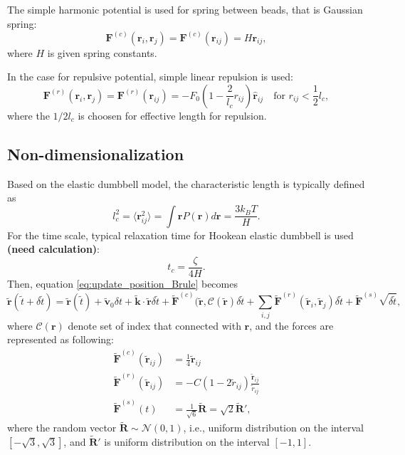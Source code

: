 \documentclass[10pt, a4paper]{article}
\begin{document}
The simple harmonic potential is used for spring between beads, that is Gaussian spring:
\begin{equation}
\mathbf{F}^{(c)}(\mathbf{r}_i, \mathbf{r}_j) = \mathbf{F}^{(c)}(\mathbf{r}_{ij}) = H\mathbf{r}_{ij},
\end{equation}
where $H$ is given spring constants. 

In the case for repulsive potential, simple linear repulsion is used:
\begin{equation}
\mathbf{F}^{(r)}(\mathbf{r}_i, \mathbf{r}_j) = \mathbf{F}^{(r)}(\mathbf{r}_{ij})=-F_0 \left(1 - \frac{2}{l_c}r_{ij}\right)\hat{\mathbf{r}}_{ij} \quad\textrm{for }r_{ij} < \frac{1}{2}l_c,
\end{equation}
where the $1/2l_c$ is choosen for effective length for repulsion.

\subsection{Non-dimensionalization}
Based on the elastic dumbbell model, the characteristic length is typically defined as
\begin{equation}
l_c^2 = \langle \mathbf{r}_{ij}^2 \rangle = \int \mathbf{r} P(\mathbf{r}) d\mathbf{r} = \frac{3k_BT}{H}.
\end{equation} 
For the time scale, typical relaxation time for Hookean elastic dumbbell is used \textbf{(need calculation)}:
\begin{equation}
t_c = \frac{\zeta}{4H}.
\end{equation}
Then, equation \eqref{eq:update_position_Brule} becomes
\begin{equation}
\tilde{\mathbf{r}}(\tilde{t} + \delta \tilde{t}) = \tilde{\mathbf{r}}(\tilde{t}) + \tilde{\mathbf{v}}_0\delta t + \tilde{\mathbf{k}}\cdot\tilde{\mathbf{r}}\delta\tilde{t} + \tilde{\mathbf{F}}^{(c)}(\tilde{\mathbf{r}}, \mathscr{C}(\tilde{\mathbf{r}})\delta\tilde{t} + \sum_{i,j}\tilde{\mathbf{F}}^{(r)}(\tilde{\mathbf{r}}_{i}, \tilde{\mathbf{r}}_{j})\delta \tilde{t} + \tilde{\mathbf{F}}^{(s)}\sqrt{\delta \tilde{t}},
\end{equation}
where $\mathscr{C}(\mathbf{r})$ denote set of index that connected with $\mathbf{r}$, and the forces are represented as following:
\begin{align}
\tilde{\mathbf{F}}^{(c)}(\tilde{\mathbf{r}}_{ij}) &= \frac{1}{4}\tilde{\mathbf{r}}_{ij} \\
\tilde{\mathbf{F}}^{(r)}(\tilde{\mathbf{r}}_{ij}) &= -C\left(1 - 2\tilde{r}_{ij}\right)\frac{\tilde{\mathbf{r}}_{ij}}{\tilde{r}_{ij}}\\
\tilde{\mathbf{F}}^{(s)}(t) &= \frac{1}{\sqrt{6}}\tilde{\mathbf{R}} = \sqrt{2}\tilde{\mathbf{R}}',
\end{align}
where the random vector $\tilde{\mathbf{R}}\sim\mathscr{N}(0, 1)$, i.e., uniform distribution on the interval $\left[-\sqrt{3}, \sqrt{3}\right]$, and $\tilde{\mathbf{R}}'$ is uniform distribution on the interval $[-1, 1]$.
\end{document}
